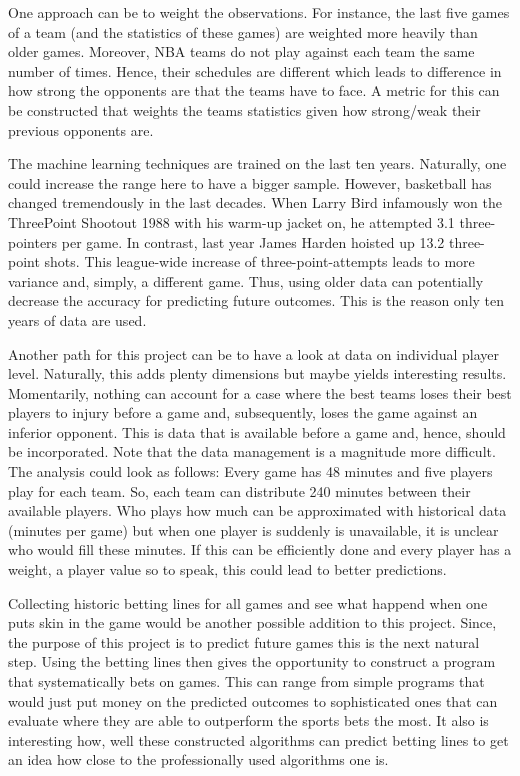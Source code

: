 \documentclass[11pt,a4paper,leqno]{article}
\begin{document}
One approach can be to weight the observations. For instance, the last five games of a team (and the statistics of these games) are weighted more heavily than older games. Moreover, NBA teams do not play against each team the same number of times. Hence, their schedules are different which leads to difference in how strong the opponents are that the teams have to face. A metric for this can be constructed that weights the teams statistics given how strong/weak their previous opponents are.

The machine learning techniques are trained on the last ten years. Naturally, one could increase the range here to have a bigger sample. However, basketball has changed tremendously in the last decades. When Larry Bird infamously won the Three\-Point Shootout 1988 with his warm-up jacket on, he attempted 3.1 three-pointers per game. In contrast, last year James Harden hoisted up 13.2 three-point shots. This league-wide increase of three-point-attempts leads to more variance and, simply, a different game. Thus, using older data can potentially decrease the accuracy for predicting future outcomes. This is the reason only ten years of data are used.

Another path for this project can be to have a look at data on individual player level. Naturally, this adds plenty dimensions but maybe yields interesting results. Momentarily, nothing can account for a case where the best teams loses their best players to injury before a game and, subsequently, loses the game against an inferior opponent. This is data that is available before a game and, hence, should be incorporated. Note that the data management is a magnitude more difficult. The analysis could look as follows: Every game has 48 minutes and five players play for each team. So, each team can distribute 240 minutes between their available players. Who plays how much can be approximated with historical data (minutes per game) but when one player is suddenly is unavailable, it is unclear who would fill these minutes. If this can be efficiently done and every player has a weight, a player value so to speak, this could lead to better predictions.

Collecting historic betting lines for all games and see what happend when one puts skin in the game would be another possible addition to this project. Since, the purpose of this project is to predict future games this is the next natural step. Using the betting lines then gives the opportunity to construct a program that systematically bets on games. This can range from simple programs that would just put money on the predicted outcomes to sophisticated ones that can evaluate where they are able to outperform the sports bets the most. It also is interesting how, well these constructed algorithms can predict betting lines to get an idea how close to the professionally used algorithms one is.
\end{document}
